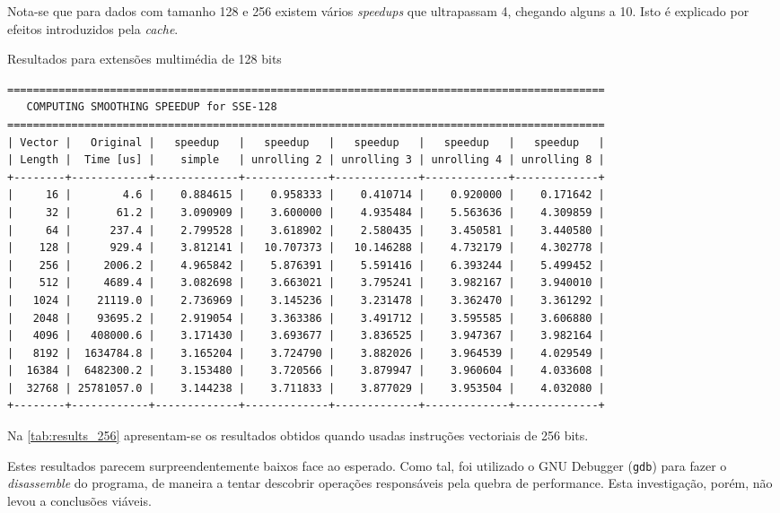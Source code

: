 \documentclass[a4paper]{article}
\begin{document}
	Nota-se que para dados com tamanho 128 e 256 existem vários \textit{speedups} que ultrapassam 4, chegando alguns a 10. Isto é explicado por efeitos introduzidos pela \textit{cache}.
	

	\begin{table}[h]
	\caption{Resultados para extensões multimédia de 128 bits}
	\label{tab:results_128}
	\begin{Verbatim}[fontsize=\small,xleftmargin=-3mm]
=============================================================================================
   COMPUTING SMOOTHING SPEEDUP for SSE-128
=============================================================================================
| Vector |   Original |   speedup   |   speedup   |   speedup   |   speedup   |   speedup   |
| Length |  Time [us] |    simple   | unrolling 2 | unrolling 3 | unrolling 4 | unrolling 8 |
+--------+------------+-------------+-------------+-------------+-------------+-------------+
|     16 |        4.6 |    0.884615 |    0.958333 |    0.410714 |    0.920000 |    0.171642 |
|     32 |       61.2 |    3.090909 |    3.600000 |    4.935484 |    5.563636 |    4.309859 |
|     64 |      237.4 |    2.799528 |    3.618902 |    2.580435 |    3.450581 |    3.440580 |
|    128 |      929.4 |    3.812141 |   10.707373 |   10.146288 |    4.732179 |    4.302778 |
|    256 |     2006.2 |    4.965842 |    5.876391 |    5.591416 |    6.393244 |    5.499452 |
|    512 |     4689.4 |    3.082698 |    3.663021 |    3.795241 |    3.982167 |    3.940010 |
|   1024 |    21119.0 |    2.736969 |    3.145236 |    3.231478 |    3.362470 |    3.361292 |
|   2048 |    93695.2 |    2.919054 |    3.363386 |    3.491712 |    3.595585 |    3.606880 |
|   4096 |   408000.6 |    3.171430 |    3.693677 |    3.836525 |    3.947367 |    3.982164 |
|   8192 |  1634784.8 |    3.165204 |    3.724790 |    3.882026 |    3.964539 |    4.029549 |
|  16384 |  6482300.2 |    3.153480 |    3.720566 |    3.879947 |    3.960604 |    4.033608 |
|  32768 | 25781057.0 |    3.144238 |    3.711833 |    3.877029 |    3.953504 |    4.032080 |
+--------+------------+-------------+-------------+-------------+-------------+-------------+
	\end{Verbatim}
	\end{table}


	Na \autoref{tab:results_256} apresentam-se os resultados obtidos quando usadas instruções vectoriais de 256 bits. 

        Estes resultados parecem surpreendentemente baixos face ao esperado. Como tal, foi utilizado o GNU Debugger (\texttt{gdb}) para fazer o \textit{disassemble} do programa, de maneira a tentar descobrir operações responsáveis pela quebra de performance. Esta investigação, porém, não levou a conclusões viáveis.
	
\end{document}
